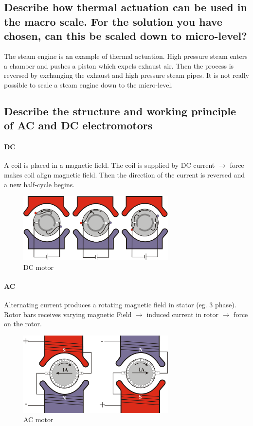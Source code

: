 \documentclass[10pt,a4paper]{article}
\begin{document}
\subsection{Describe how thermal actuation can be used in the macro scale. For the solution you have chosen, can this be scaled down to micro-level?}

The steam engine is an example of thermal actuation. High pressure steam enters a chamber and pushes a piston which expels exhaust air. Then the process is reversed by exchanging the exhaust and high pressure steam pipes. It is not really possible to scale a steam engine down to the micro-level.

\subsection{Describe the structure and working principle of AC and DC electromotors}

\paragraph{DC} A coil is placed in a magnetic field. The coil is supplied by DC current $\rightarrow$ force makes coil align magnetic field. Then the direction of the current is reversed and a new half-cycle begins.

\begin{figure}[h!]
	\centering
	\includegraphics[width=0.7\textwidth]{dc-motor.png}
	\caption{DC motor}
\end{figure}

\paragraph{AC} Alternating current produces a rotating magnetic field in stator (eg. 3 phase). Rotor bars receives varying magnetic Field $\rightarrow$ induced current in rotor $\rightarrow$ force on the rotor.

\begin{figure}[h!]
	\centering
	\includegraphics[width=0.7\textwidth]{ac-motor.png}
	\caption{AC motor}
\end{figure}
\end{document}
